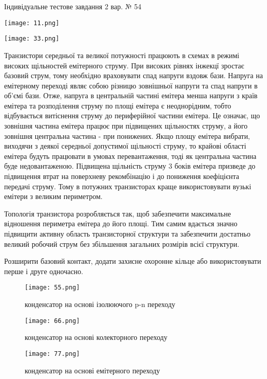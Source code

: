 \documentclass[a4paper,14pt]{extreport}
\begin{document}
\pagecolor{white}

\begin{center}
Індивідуальне тестове завдання 2 вар. № 54
\end{center}


\begin{enumerate}
  \item \texttt{[image: 11.png]}
  \item \texttt{[image: 33.png]}
  \item Транзистори середньої та великої потужності працюють в схемах в режимі високих щільностей емітерного струму. При високих рівнях інжекцї зростає базовий струм, тому необхідно враховувати спад напруги вздовж бази. Напруга на емітерному переході являє собою різницю зовнішньої напруги та спад напруги в об'ємі бази. Отже, напруга в центральній частині емітера менша напруги з країв емітера та розподілення струму по площі емітера є неоднорідним, тобто відбувається витіснення струму до периферійної частини емітера. Це означає, що зовнішня частина емітера працює при підвищених щільностях струму, а його зовнішня центральна частина - при понижених. Якщо площу емітера вибрати, виходячи з деякої середньої допустимої щільності струму, то крайові області емітера будуть працювати в умовах перевантаження, тоді як центральна частина буде недовантаженою. Підвищена щільність струму 3 боків емітера призведе до підвищення втрат на поверхневу рекомбінацію і до пониження коефіцієнта передачі струму. Тому в потужних транзисторах краще використовувати вузькі емітери з великим периметром.\par
  Топологія транзистора розробляється так, щоб забезпечити максимальне відношення периметра емітера до його площі. Тим самим вдається значно підвищити активну область транзисторної структури та забезпечити достатньо великий робочий струм без збільшення загальних розмірів всієї структури.
  \item Розширити базовий контакт, додати захисне охоронне кільце або використовувати перше і друге одночасно.
  \begin{figure}[h]
  \item 
        \texttt{[image: 55.png]}
        \caption{конденсатор на основі ізолюючого p-n переходу}
        
        \texttt{[image: 66.png]}
        \caption{конденсатор на основі колекторного переходу}
        
        \texttt{[image: 77.png]}
        \caption{конденсатор на основі емітерного переходу}
        

\end{figure}
\end{enumerate}
\end{document}
